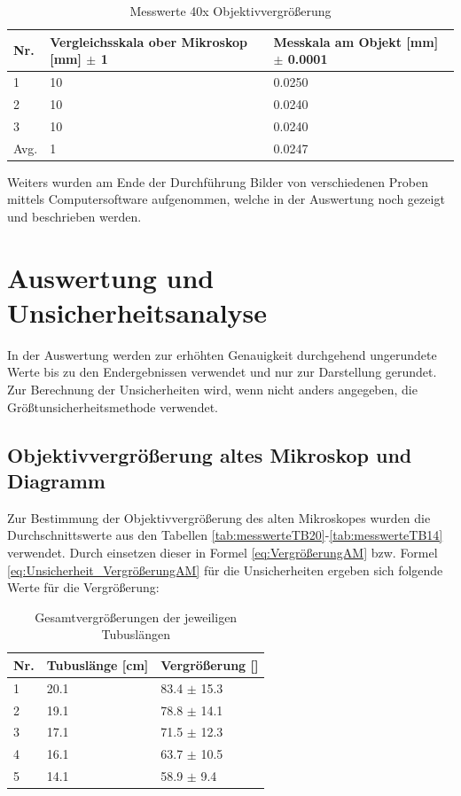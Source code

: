\documentclass[12pt,a4paper,twoside]{article}
\begin{document}
\begin{table}[H]
    \centering
    \caption{Messwerte 40x Objektivvergrößerung}
    \label{tab:messwerteNM40x}
    \begin{tabular}{| l | l | l |}
        \hline
        Nr.   & Vergleichsskala ober Mikroskop [mm] $\pm$ 1 & Messkala am Objekt [mm] $\pm$ 0.0001 \\
        \hline
        1 & 10 & 0.0250 \\
        2 & 10 & 0.0240 \\
        3 & 10 & 0.0240 \\
        \hline
        Avg. & 1 & 0.0247 \\
        \hline
    \end{tabular}
\end{table}

\noindent
Weiters wurden am Ende der Durchführung Bilder von verschiedenen Proben mittels Computersoftware  aufgenommen, welche in der Auswertung noch gezeigt und beschrieben werden.


\section{Auswertung und Unsicherheitsanalyse} %

In der Auswertung werden zur erhöhten Genauigkeit durchgehend ungerundete Werte bis zu den Endergebnissen verwendet und nur zur Darstellung gerundet. \\
Zur Berechnung der Unsicherheiten wird, wenn nicht anders angegeben, die Größtunsicherheitsmethode verwendet.

\subsection{Objektivvergrößerung altes Mikroskop und Diagramm}
Zur Bestimmung der Objektivvergrößerung des alten Mikroskopes wurden die Durchschnittswerte aus den Tabellen \ref{tab:messwerteTB20}-\ref{tab:messwerteTB14} verwendet.
Durch einsetzen dieser in Formel \ref{eq:VergrößerungAM} bzw. Formel \ref{eq:Unsicherheit_VergrößerungAM} für die Unsicherheiten ergeben sich folgende Werte für die Vergrößerung:

\begin{table}[H]
    \centering
    \caption{Gesamtvergrößerungen der jeweiligen Tubuslängen}
    \label{tab:Gesamtvergrößerung}
    \begin{tabular}{| l | l | l |}
        \hline
        Nr.   & Tubuslänge [cm]  & Vergrößerung [] \\
        \hline
        1 & 20.1 & 83.4 $\pm$ 15.3 \\
        2 & 19.1 & 78.8 $\pm$ 14.1 \\
        3 & 17.1 & 71.5 $\pm$ 12.3 \\
        4 & 16.1 & 63.7 $\pm$ 10.5 \\
        5 & 14.1 & 58.9 $\pm$ 9.4 \\
        \hline
    \end{tabular}
\end{table}
\end{document}
